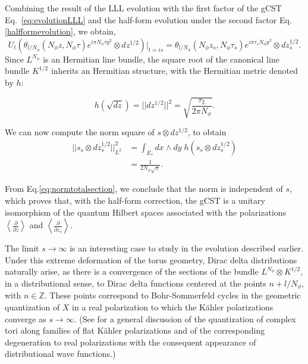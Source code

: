 \documentclass[a4paper,11pt]{article}
\begin{document}
Combining the result of the LLL evolution with the first factor of the gCST Eq.~\eqref{eq:evolutionLLL} and the half-form evolution under the second factor Eq.\eqref{halfformevolution}, we obtain, 
\begin{equation}
U_{t}\left(\theta_{l/N_{\phi}}(N_{\phi}z,N_{\phi}\tau)e^{i\pi N_{\phi}\tau y^2}\otimes dz^{1/2}\right)\bigg|_{t=is}= \theta_{l/N_{\phi}}(N_{\phi}z_{s},N_{\phi}\tau_{s})e^{i\pi\tau_{s} N_{\phi}y^2}\otimes dz_{s}^{1/2}.
\end{equation}
Since $L^{N_{\phi}}$ is an Hermitian line bundle, the square root of the canonical line bundle $K^{1/2}$ inherits an Hermitian structure, with the Hermitian metric denoted by $h$:

\begin{equation}
h(\sqrt{dz}) = ||dz^{1/2}||^{2} = \sqrt{\frac{\tau_{2}}{2\pi N_{\phi}}}.  
\end{equation}

We can now compute the norm square of $s\otimes dz^{1/2}$, to obtain
\begin{align}
||s_{s}\otimes dz_{s}^{1/2}||^{2}_{L^2} &= \int_{E_{\tau}}dx\wedge dy \; h(s_{s}\otimes dz_{s}^{1/2})\nonumber\\
&= \frac{1}{2N_{\phi}\sqrt{\pi}}.
\label{eq:normtotalsection}
\end{align}

From Eq.\eqref{eq:normtotalsection}, we conclude that the norm is independent of $s$, which proves that, with the half-form correction, the gCST is a unitary isomorphism of the quantum Hilbert spaces associated with the polarizations $\left\langle \frac{\partial}{\partial z} \right\rangle$ and $\left\langle \frac{\partial}{\partial z_{s}} \right\rangle$. 

The limit $s\rightarrow \infty$ is an interesting case to study in the evolution described earlier. Under this extreme deformation of the torus geometry, Dirac delta distributions naturally arise, as there is a convergence of the sections of the bundle $L^{N_{\phi}}\otimes K^{1/2}$, in a distributional sense, to Dirac delta functions centered at the points $n+l/N_{\phi}$, with $n\in\mathbb{Z}$. These points correspond to Bohr-Sommerfeld cycles in the geometric quantization of $X$ in a real polarization to which the K\"ahler polarizations converge as $s\to\infty$.
(See \cite{BaierMouraoNunes} for a general discussion of the quantization of complex tori along families of flat K\"ahler polarizations and of the corresponding degeneration to real polarizations with the consequent appearance of distributional wave functions.)
\end{document}
